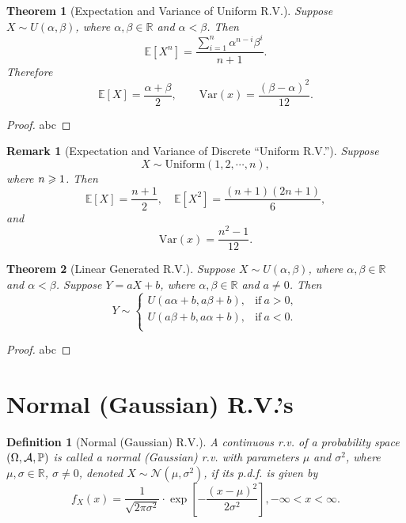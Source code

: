 \documentclass[openany,12pt]{book}
\newtheorem{theorem}{Theorem}[chapter]
\newtheorem{remark}{Remark}[chapter]
\newtheorem{definition}{Definition}[chapter]
\begin{document}
\begin{theorem}[Expectation and Variance of Uniform R.V.]
  Suppose $X\sim U(\alpha,\beta)$, where $\alpha,\beta\in\mathbb{R}$ and $\alpha<\beta$. Then
  $$
    \mathbb{E}[ X^{n}] = \frac{\sum_{i = 1}^{n}{\alpha^{n - i}\beta^{i}}}{n + 1}.
  $$
  Therefore
  $$
    \mathbb{E}[ X] = \frac{\alpha + \beta}{2},\qquad
    \mathrm{Var}(x)=\frac{(\beta-\alpha)^2}{12}.
  $$
\end{theorem}

\begin{proof}
  abc
\end{proof}

\begin{remark}[Expectation and Variance of Discrete ``Uniform R.V.'']
  Suppose
  $$
    X\sim \mathrm{Uniform}(1,2, \cdots,n),
  $$
  where $n\geqslant1$. Then
  $$
    \mathbb{E}[ X] = \frac{n + 1}{2},\quad \mathbb{E}\left[ X^{2}\right] = \frac{(n + 1)(2n + 1)}{6},
  $$
  and
  $$
    \mathrm{Var}(x)=\frac{n^2-1}{12}.
  $$
\end{remark}

\begin{theorem}[Linear Generated R.V.]
  Suppose $X\sim U(\alpha,\beta)$, where $\alpha,\beta\in\mathbb{R}$ and $\alpha<\beta$. Suppose $Y=aX+b$, where $\alpha,\beta\in\mathbb{R}$ and $a\neq0$. Then
  \[
    Y\sim
    \begin{cases}
      U(a\alpha+b, a\beta+b), &\text{if}~ a > 0, \\
      U(a\beta+b, a\alpha+b), &\text{if}~ a < 0. \\
    \end{cases}
  \]
\end{theorem}

\begin{proof}
  abc
\end{proof}

\section{Normal (Gaussian) R.V.'s}

\begin{definition}[Normal (Gaussian) R.V.]
  A continuous r.v. of a probability space $(\Omega,\mathcal{A},\mathbb{P})$ is called a normal (Gaussian) r.v. with parameters $\mu$ and $\sigma^2$, where $\mu,\sigma\in\mathbb{R}$, $\sigma\neq0$, denoted $X\sim \mathcal{N}(\mu,\sigma^2)$, if its p.d.f. is given by
  $$
    f_X(x)=\frac{1}{\sqrt{2\pi\sigma^2}}\cdot\exp\left[{-\frac{(x-\mu)^2}{2\sigma^2}}\right], -\infty<x<\infty.
  $$
\end{definition}
\end{document}

